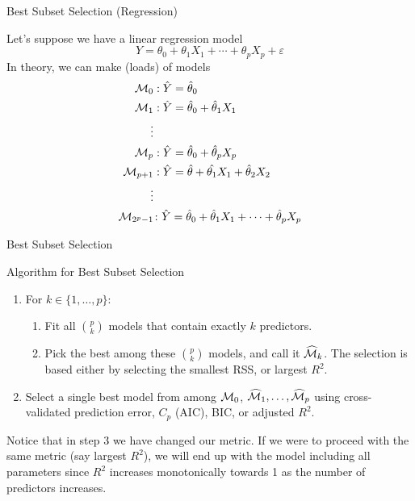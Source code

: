 \documentclass{beamer}
\begin{document}
\begin{frame}{Best Subset Selection (Regression) }
	
	Let's suppose we have a linear regression model
	\begin{equation*}
		Y = \theta_0+ \theta_1 X_1 + \cdots + \theta_p X_p + \varepsilon
	\end{equation*}
In theory, we can make (loads) of models 
\begin{equation*}
	\begin{split}
		{\cal M}_0 &: \hat{Y}= \hat{\theta}_0\\
				{\cal M}_1 &: \hat{Y}= \hat{\theta}_0+ \hat{\theta}_1 X_1 \\
				\vdots&\\
				{\cal M}_p &: \hat{Y}= \hat{\theta}_0+ \hat{\theta}_p X_p \\
				{\cal M}_{p+1} &: \hat{Y}= \hat{\theta}+ \hat{\theta_1} X_1+ \hat{\theta}_2 X_2  \\
				\vdots &\\
				{\cal M}_{2^p-1}& \colon \hat{Y }= \hat{\theta}_0+ \hat{\theta}_1 X_1 + \cdots + \hat{\theta}_p X_p 
	\end{split}
\end{equation*}
\end{frame}

\begin{frame}{Best Subset Selection}
	
	Algorithm for Best Subset Selection
	\begin{enumerate}
		\item For $k\in \{1,\ldots,p\}$:
		\begin{enumerate}
			\item Fit all $p \choose k$ models that contain exactly $k$ predictors.
			\item Pick the best among these $p \choose k$ models, and call it $\widehat{\cal M}_k$. The selection is based either by selecting the smallest RSS, or largest $R^2$.
		\end{enumerate}
	\item Select a single best model from among ${\cal M}_0$, $\widehat{\cal M}_1,\ldots, \widehat{\cal M}_p$ using cross-validated prediction error, $C_p$ (AIC), BIC, or adjusted $R^2$.
	\end{enumerate}
Notice that in step 3 we have changed our metric. If we were to proceed with the same metric (say largest $R^2$), we will end up with the model including all parameters since $R^2$ increases monotonically towards 1 as the number of predictors increases. 
\end{frame}
\end{document}
